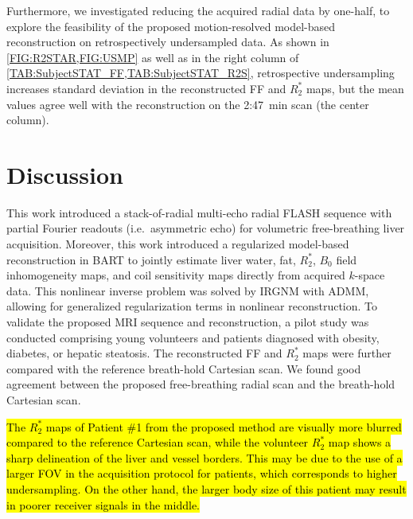 \documentclass[journal,twoside,web]{ieeecolor}
\begin{document}
Furthermore, we investigated reducing the acquired radial data by one-half, 
to explore the feasibility of the proposed motion-resolved model-based reconstruction 
on retrospectively undersampled data. 
As shown in \cref{FIG:R2STAR,FIG:USMP} as well as in the right column of 
\cref{TAB:SubjectSTAT_FF,TAB:SubjectSTAT_R2S}, retrospective undersampling 
increases standard deviation in the reconstructed FF and $R_2^*$ maps, 
but the mean values agree well with the reconstruction on the 2:47~min scan (the center column).



\section{Discussion}

This work introduced a stack-of-radial multi-echo radial FLASH sequence 
with partial Fourier readouts (i.e.~asymmetric echo) 
for volumetric free-breathing liver acquisition. 
Moreover, this work introduced a regularized model-based reconstruction 
in BART to jointly estimate liver water, fat, $R_2^*$, 
$B_0$ field inhomogeneity maps, and coil sensitivity maps 
directly from acquired $k$-space data. 
This nonlinear inverse problem was solved by IRGNM with ADMM, 
allowing for generalized regularization terms in nonlinear reconstruction. 
To validate the proposed MRI sequence and reconstruction, 
a pilot study was conducted comprising young volunteers and 
patients diagnosed with obesity, diabetes, or hepatic steatosis. 
The reconstructed FF and $R_2^*$ maps were further compared with 
the reference breath-hold Cartesian scan. 
We found good agreement between the proposed free-breathing radial scan 
and the breath-hold Cartesian scan.

\hl{The $R_2^*$ maps of Patient \#1 from the proposed method are visually more blurred 
compared to the reference Cartesian scan, 
while the volunteer $R_2^*$ map shows a sharp delineation of the liver and vessel borders. 
This may be due to the use of a larger FOV in the acquisition protocol for patients, 
which corresponds to higher undersampling. 
On the other hand, the larger body size of this patient 
may result in poorer receiver signals in the middle.}
\end{document}
